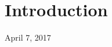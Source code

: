 \documentclass[conference]{IEEEtran}
\begin{document}




%
\IEEEpeerreviewmaketitle



\section{Introduction}

\hfill April 7, 2017

%
%

\end{document}
